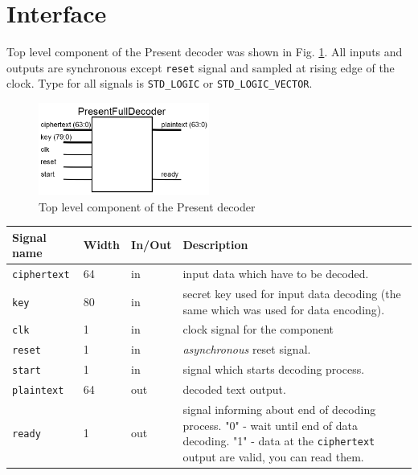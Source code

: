 \documentclass{gajewski}
\begin{document}
\newpage 

\section{Interface}

Top level component of the Present decoder was shown in Fig. \ref{pfdec}. All inputs and outputs are synchronous except \texttt{reset} signal and sampled at rising edge of the clock. Type for all signals is \texttt{STD\_LOGIC} or \texttt{STD\_LOGIC\_VECTOR}.
\begin{figure}[!ht]%
    \begin{center}
    \includegraphics[width=0.5\textwidth]{img/PresentFullDecoder.png}
    \caption{%
        Top level component of the Present decoder
     }%
    \label{pfdec}
    \end{center}
 \end{figure}

\begin{tabularx}{\textwidth}{|p{30mm}|p{11mm}|p{11mm}|X|}
  \hline \bf{Signal name} & \bf{Width} & \bf{In/Out} & \bf{Description}\\ 
  \hline \texttt{ciphertext}	& 64  &  in  & input data which have to be decoded. \\ 
  \hline \texttt{key}	& 80  &  in  & secret key used for input data decoding (the same which was used for data encoding). \\ 
  \hline \texttt{clk}	& 1  &  in  &  clock signal for the component\\ 
  \hline \texttt{reset} & 1   &  in  & \emph{asynchronous} reset signal.	\\ 
  \hline \texttt{start} & 1   &  in  & signal which starts decoding process. \\ 
  \hline \texttt{plaintext} & 64   &  out  & decoded text output. \\ 
  \hline \texttt{ready} & 1   &  out  & signal informing about end of decoding process. \newline  "0" - wait until end of data decoding. \newline  "1" - data at the \texttt{ciphertext} output are valid, you can read them. \\ 
  \hline
\end{tabularx}
\end{document}
